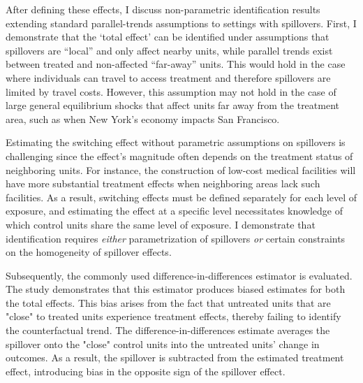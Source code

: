 \documentclass[11pt]{article}
\begin{document}
After defining these effects, I discuss non-parametric identification results extending standard parallel-trends assumptions to settings with spillovers. First, I demonstrate that the `total effect' can be identified under assumptions that spillovers are ``local'' and only affect nearby units, while parallel trends exist between treated and non-affected ``far-away'' units. This would hold in the case where individuals can travel to access treatment and therefore spillovers are limited by travel costs. However, this assumption may not hold in the case of large general equilibrium shocks that affect units far away from the treatment area, such as when New York's economy impacts San Francisco.

Estimating the switching effect without parametric assumptions on spillovers is challenging since the effect's magnitude often depends on the treatment status of neighboring units. For instance, the construction of low-cost medical facilities will have more substantial treatment effects when neighboring areas lack such facilities. As a result, switching effects must be defined separately for each level of exposure, and estimating the effect at a specific level necessitates knowledge of which control units share the same level of exposure. I demonstrate that identification requires \emph{either} parametrization of spillovers \emph{or} certain constraints on the homogeneity of spillover effects.

Subsequently, the commonly used difference-in-differences estimator is evaluated. The study demonstrates that this estimator produces biased estimates for both the total effects. This bias arises from the fact that untreated units that are "close" to treated units experience treatment effects, thereby failing to identify the counterfactual trend. The difference-in-differences estimate averages the spillover onto the "close" control units into the untreated units' change in outcomes. As a result, the spillover is subtracted from the estimated treatment effect, introducing bias in the opposite sign of the spillover effect. 
\end{document}
